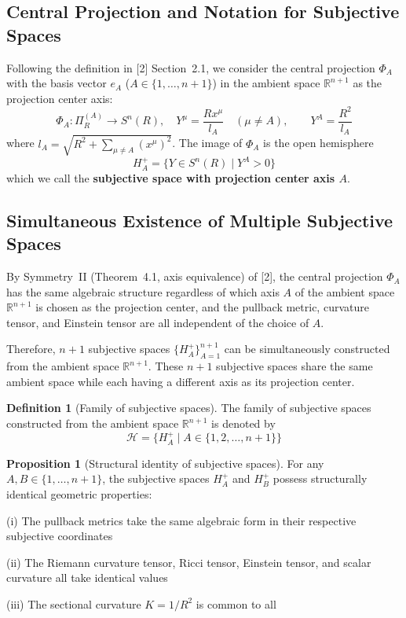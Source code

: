 \documentclass[a4paper,11pt]{article}
\theoremstyle{definition}
\newtheorem{proposition}[theorem]{Proposition}
\newtheorem{definition}[theorem]{Definition}
\begin{document}
\subsection{Central Projection and Notation for Subjective Spaces}

Following the definition in {[2]} Section~2.1, we consider the central projection \(\Phi_A\) with the basis vector \(e_A\) (\(A \in \{1, \ldots, n+1\}\)) in the ambient space \(\mathbb{R}^{n+1}\) as the projection center axis:
\begin{equation}
\Phi_A: \Pi_R^{(A)} \to S^n(R), \quad Y^\mu = \frac{Rx^\mu}{l_A} \quad (\mu \neq A), \qquad Y^A = \frac{R^2}{l_A} \tag{2.1}
\end{equation}
where \(l_A = \sqrt{R^2 + \sum_{\mu \neq A}(x^\mu)^2}\). The image of \(\Phi_A\) is the open hemisphere
\begin{equation}
H_A^+ = \{Y \in S^n(R) \mid Y^A > 0\} \tag{2.2}
\end{equation}
which we call the \textbf{subjective space with projection center axis \(A\)}.

\subsection{Simultaneous Existence of Multiple Subjective Spaces}

By Symmetry~II (Theorem~4.1, axis equivalence) of {[2]}, the central projection \(\Phi_A\) has the same algebraic structure regardless of which axis \(A\) of the ambient space \(\mathbb{R}^{n+1}\) is chosen as the projection center, and the pullback metric, curvature tensor, and Einstein tensor are all independent of the choice of \(A\).

Therefore, \(n+1\) subjective spaces \(\{H_A^+\}_{A=1}^{n+1}\) can be simultaneously constructed from the ambient space \(\mathbb{R}^{n+1}\). These \(n+1\) subjective spaces share the same ambient space while each having a different axis as its projection center.

\begin{definition}[Family of subjective spaces]
The family of subjective spaces constructed from the ambient space \(\mathbb{R}^{n+1}\) is denoted by
\begin{equation}
\mathcal{H} = \{H_A^+ \mid A \in \{1, 2, \ldots, n+1\}\} \tag{2.3}
\end{equation}
\end{definition}

\begin{proposition}[Structural identity of subjective spaces]
For any \(A, B \in \{1, \ldots, n+1\}\), the subjective spaces \(H_A^+\) and \(H_B^+\) possess structurally identical geometric properties:

\textup{(i)} The pullback metrics take the same algebraic form in their respective subjective coordinates

\textup{(ii)} The Riemann curvature tensor, Ricci tensor, Einstein tensor, and scalar curvature all take identical values

\textup{(iii)} The sectional curvature \(K = 1/R^2\) is common to all
\end{proposition}
\end{document}
